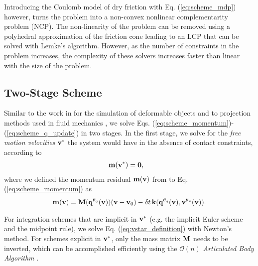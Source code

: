 Introducing the Coulomb model of dry friction with Eq. (\ref{eq:scheme_mdp})
however, turns the problem into a non-convex nonlinear complementarity problem
(NCP). The non-linearity of the problem can be removed using a polyhedral
approximation of the friction cone leading to an LCP that can be solved with
Lemke's algorithm. However, as the number of constraints in the problem
increases, the complexity of these solvers increases faster than linear
 with
the size of the problem.

\subsection{Two-Stage Scheme}

Similar to the work in \cite{bib:duriez2005realistic} for the simulation of
deformable objects and to projection methods used in fluid mechanics
\cite{bib::bell1991efficient}, we solve Eqs.
(\ref{eq:scheme_momentum})-(\ref{eq:scheme_q_update}) in two stages. In the
first stage, we solve for the \emph{free motion velocities} ${\mathbf{v}}^*$ the
system would have in the absence of contact constraints, according to
\begin{align}
	\mf{m}(\mf{v}^*) &= \mf{0},
	\label{eq:vstar_definition}
\end{align}
where we defined the momentum residual ${\mathbf{m}}({\mathbf{v}})$ from to Eq.
(\ref{eq:scheme_momentum}) as
\begin{multline}
	\mf{m}(\mf{v}) =
	\mf{M}(\mf{q}^{\theta_{q}}(\mf{v}))(\mf{v}-\mf{v}_0) -
	\delta t\,\mf{k}(\mf{q}^{\theta_{q}}(\mf{v}),\mf{v}^{\theta_v}(\mf{v})).
	\label{eq:m_definition}
\end{multline}

For integration schemes that are implicit in ${\mathbf{v}}^*$ (e.g. the implicit Euler
scheme and the midpoint rule), we solve Eq. (\ref{eq:vstar_definition}) with
Newton's method. For schemes explicit in ${\mathbf{v}}^*$, only the mass matrix
${\mathbf{M}}$ needs to be inverted, which can be accomplished efficiently using the
$\mathcal{O}(n)$ \emph{Articulated Body Algorithm}
\cite{bib:featherstone2008_rigid_body_dynamics_algorithms}.

